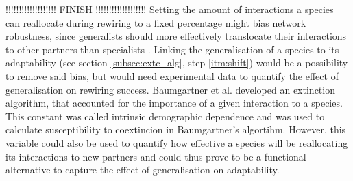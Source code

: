 \documentclass[12pt,a4paper]{article}
\begin{document}
!!!!!!!!!!!!!!!!!!! FINISH !!!!!!!!!!!!!!!!!!!
%
Setting the amount of interactions a species can reallocate during rewiring to a fixed percentage might bias network robustness, since generalists should more effectively translocate their interactions to other partners than specialists \parencite{Ramos-Jiliberto2012}. Linking the generalisation of a species to its adaptability (see section \ref{subsec:extc_alg}, step \ref{itm:shift}) would be a possibility to remove said bias, but would need experimental data to quantify the effect of generalisation on rewiring success. Baumgartner et al. \parencite{Baumgartner2020} developed an extinction algorithm, that accounted for the importance of a given interaction to a species. This constant was called intrinsic demographic dependence and was used to calculate susceptibility to coextincion in Baumgartner's algortihm. However, this variable could also be used to quantify how effective a species will be reallocating its interactions to new partners and could thus prove to be a functional alternative to capture the effect of generalisation on adaptability. \paragraph{}

 


\end{document}
